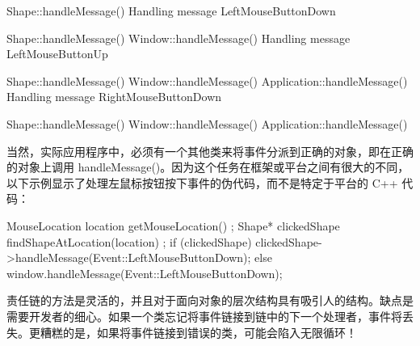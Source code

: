 \begin{shell}
Shape::handleMessage()
    Handling message LeftMouseButtonDown

Shape::handleMessage()
Window::handleMessage()
    Handling message LeftMouseButtonUp

Shape::handleMessage()
Window::handleMessage()
Application::handleMessage()
    Handling message RightMouseButtonDown

Shape::handleMessage()
Window::handleMessage()
Application::handleMessage()
\end{shell}

当然，实际应用程序中，必须有一个其他类来将事件分派到正确的对象，即在正确的对象上调用 handleMessage()。因为这个任务在框架或平台之间有很大的不同，以下示例显示了处理左鼠标按钮按下事件的伪代码，而不是特定于平台的 C++ 代码：

\begin{cpp}
MouseLocation location { getMouseLocation() };
Shape* clickedShape { findShapeAtLocation(location) };
if (clickedShape) {
    clickedShape->handleMessage(Event::LeftMouseButtonDown);
} else {
    window.handleMessage(Event::LeftMouseButtonDown);
}
\end{cpp}

责任链的方法是灵活的，并且对于面向对象的层次结构具有吸引人的结构。缺点是需要开发者的细心。如果一个类忘记将事件链接到链中的下一个处理者，事件将丢失。更糟糕的是，如果将事件链接到错误的类，可能会陷入无限循环！



















